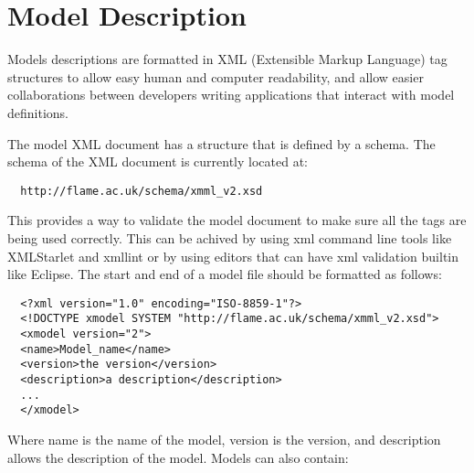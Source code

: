 \section{Model Description}
\label{sec:model_description}

Models descriptions are formatted in XML (Extensible Markup Language) tag
structures to allow easy human and computer readability, and allow easier collaborations between
developers writing applications that interact with model definitions.

The model XML document has a structure that is defined by a schema.
The schema of the XML document is currently located
at:

\begin{verbatim}
  http://flame.ac.uk/schema/xmml_v2.xsd
\end{verbatim}

This provides a way to validate the model document to make sure all the tags are
being used correctly. This can be achived by using xml command line tools like
XMLStarlet and xmllint or by using editors that
can have xml validation builtin like Eclipse. The start and end
of a model file should be formatted as follows:

\begin{verbatim}
  <?xml version="1.0" encoding="ISO-8859-1"?>
  <!DOCTYPE xmodel SYSTEM "http://flame.ac.uk/schema/xmml_v2.xsd">
  <xmodel version="2">
  <name>Model_name</name>
  <version>the version</version>
  <description>a description</description>
  ...
  </xmodel>
\end{verbatim}

Where name is the name of the model, version is the version, and description
allows the description of the model. Models can also contain:

